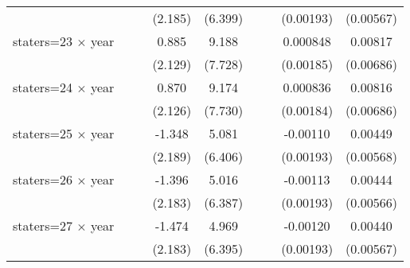 {\begin{longtable}{l*{8}{c}}
                    &                     &                     &     (2.185)         &     (6.399)         &                     &                     &   (0.00193)         &   (0.00567)         \\
[1em]
staters=23 $\times$ year&                     &                     &       0.885         &       9.188         &                     &                     &    0.000848         &     0.00817         \\
                    &                     &                     &     (2.129)         &     (7.728)         &                     &                     &   (0.00185)         &   (0.00686)         \\
[1em]
staters=24 $\times$ year&                     &                     &       0.870         &       9.174         &                     &                     &    0.000836         &     0.00816         \\
                    &                     &                     &     (2.126)         &     (7.730)         &                     &                     &   (0.00184)         &   (0.00686)         \\
[1em]
staters=25 $\times$ year&                     &                     &      -1.348         &       5.081         &                     &                     &    -0.00110         &     0.00449         \\
                    &                     &                     &     (2.189)         &     (6.406)         &                     &                     &   (0.00193)         &   (0.00568)         \\
[1em]
staters=26 $\times$ year&                     &                     &      -1.396         &       5.016         &                     &                     &    -0.00113         &     0.00444         \\
                    &                     &                     &     (2.183)         &     (6.387)         &                     &                     &   (0.00193)         &   (0.00566)         \\
[1em]
staters=27 $\times$ year&                     &                     &      -1.474         &       4.969         &                     &                     &    -0.00120         &     0.00440         \\
                    &                     &                     &     (2.183)         &     (6.395)         &                     &                     &   (0.00193)         &   (0.00567)         \\

\end{longtable}}

